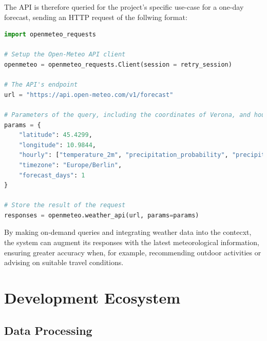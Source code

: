 The API is therefore queried for the project's specific use-case for a one-day forecast, sending an HTTP request of the follwing format:

\begin{center}
\begin{minipage}{0.7\textwidth}
\begin{lstlisting}[language=Python, frame=single, caption=Open-Meteo HTTP Reuquest]
import openmeteo_requests

# Setup the Open-Meteo API client
openmeteo = openmeteo_requests.Client(session = retry_session)
    
# The API's endpoint
url = "https://api.open-meteo.com/v1/forecast"

# Parameters of the query, including the coordinates of Verona, and hourly data of temperature, precipitation and precipitation probability for the current day
params = {
    "latitude": 45.4299,
    "longitude": 10.9844,
    "hourly": ["temperature_2m", "precipitation_probability", "precipitation", "weather_code"],
    "timezone": "Europe/Berlin",
    "forecast_days": 1
}

# Store the result of the request
responses = openmeteo.weather_api(url, params=params)
\end{lstlisting}
\end{minipage}
\end{center}

By making on-demand queries and integrating weather data into the contecxt, the system can augment its responses with the latest meteorological information, ensuring greater accuracy when, for example, recommending outdoor activities or advising on suitable travel conditions.




\section{Development Ecosystem}
\label{sec:development-ecosystem}

\subsection{Data Processing}
\label{sec:data-preprocessing}

